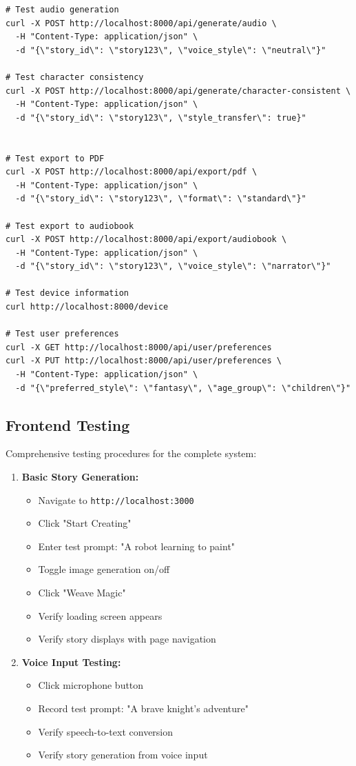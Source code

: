 {\begin{verbatim}
# Test audio generation
curl -X POST http://localhost:8000/api/generate/audio \
  -H "Content-Type: application/json" \
  -d "{\"story_id\": \"story123\", \"voice_style\": \"neutral\"}"

# Test character consistency
curl -X POST http://localhost:8000/api/generate/character-consistent \
  -H "Content-Type: application/json" \
  -d "{\"story_id\": \"story123\", \"style_transfer\": true}"


# Test export to PDF
curl -X POST http://localhost:8000/api/export/pdf \
  -H "Content-Type: application/json" \
  -d "{\"story_id\": \"story123\", \"format\": \"standard\"}"

# Test export to audiobook
curl -X POST http://localhost:8000/api/export/audiobook \
  -H "Content-Type: application/json" \
  -d "{\"story_id\": \"story123\", \"voice_style\": \"narrator\"}"

# Test device information
curl http://localhost:8000/device

# Test user preferences
curl -X GET http://localhost:8000/api/user/preferences
curl -X PUT http://localhost:8000/api/user/preferences \
  -H "Content-Type: application/json" \
  -d "{\"preferred_style\": \"fantasy\", \"age_group\": \"children\"}"
\end{verbatim}

\subsection{Frontend Testing}
Comprehensive testing procedures for the complete system:
\begin{enumerate}
    \item \textbf{Basic Story Generation:}
    \begin{itemize}
        \item Navigate to \texttt{http://localhost:3000}
        \item Click "Start Creating"
        \item Enter test prompt: "A robot learning to paint"
        \item Toggle image generation on/off
        \item Click "Weave Magic"
        \item Verify loading screen appears
        \item Verify story displays with page navigation
    \end{itemize}
    
    \item \textbf{Voice Input Testing:}
    \begin{itemize}
        \item Click microphone button
        \item Record test prompt: "A brave knight's adventure"
        \item Verify speech-to-text conversion
        \item Verify story generation from voice input
    \end{itemize}
    

\end{enumerate}}
